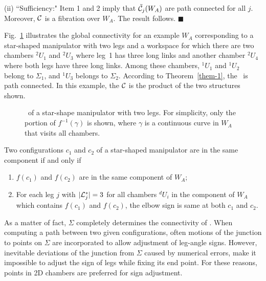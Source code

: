 (ii) ``Sufficiency:" Item 1 and 2 imply that ${\tilde {\cal
C}}_j(W_A)$ are path connected for all $j$. Moreover, ${\cal C}$
is a fibration over $W_A$. The result follows.
 \hfill$\blacksquare$\medskip

Fig.~\ref{fibre} illustrates the global connectivity for an
example $W_A$ corresponding to a star-shaped manipulator with two
legs and a workspace for which there are two chambers $^2U_1$ and
$^2U_3$ where leg~1 has three long links and another chamber
$^2U_4$ where both legs have three long links.  Among these
chambers, ${}^1\!U_1$ and ${}^1\!U_2$ belong to $\Sigma_1$, and
${}^1\!U_3$ belongs to $\Sigma_2$. According to
Theorem~\ref{them-1}, the \cspace \ is path connected.  In this
example, the ${\cal C}$ is the product of the two structures
shown.
%
\begin{figure}
 \vbox{
      }
 \caption{\cspace \ of a star-shape manipulator with two legs.
 For simplicity, only the portion of $f^{-1}(\gamma)$
 is shown, where $\gamma$ is a continuous curve in $W_A$
 that visits all chambers. }
 \label{fibre}
\end{figure}

\smallskip

\begin{Corollary}
\label{cor-1} \rm Two configurations $c_1$ and $c_2$ of a
star-shaped manipulator are in the same component if and only if
\begin{enumerate}
\item $f(c_1)$ and $f(c_2)$ are in the same component of $W_A$;
\item For each leg $j$ with $|{\cal L}_j^*|=3$ for all chambers
${}^d\!U_i$ in the component of $W_A$ which contains $f(c_1)$ and
$f(c_2)$, the elbow sign is same at both $c_1$ and $c_2$.
\end{enumerate}
\end{Corollary}

\medskip

\begin{Remark}
\rm As a matter of fact, $\Sigma$ completely determines the
connectivity of \cspace. When computing a path between two given
configurations, often motions of the junction to points on
$\Sigma$ are incorporated to allow adjustment of leg-angle signs.
However, inevitable deviations of the junction from $\Sigma$
caused by numerical errors, make it impossible to adjust the sign
of legs while fixing its end point. For these reasons, points in
2D chambers are preferred for sign adjustment.
\end{Remark}

